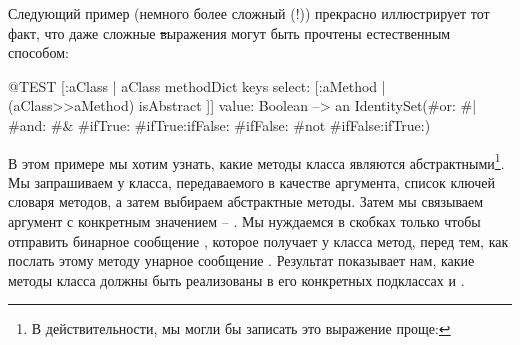 \documentclass[a4paper,10pt,twoside]{book}
\begin{document}
Следующий пример (немного более сложный (!)) прекрасно иллюстрирует тот факт, что даже сложные \st выражения могут быть прочтены естественным способом:
\begin{code}{@TEST}
[:aClass | aClass methodDict keys select: [:aMethod | (aClass>>aMethod) isAbstract ]] value: Boolean --> an IdentitySet(#or: #| #and: #& #ifTrue: #ifTrue:ifFalse: #ifFalse: #not #ifFalse:ifTrue:)
\end{code}
\noindent
В этом примере мы хотим узнать, какие методы класса  являются абстрактными\footnote{В действительности, мы могли бы записать это выражение проще: }.
Мы запрашиваем у класса, передаваемого в качестве аргумента, список ключей словаря методов, а затем выбираем абстрактные методы.
Затем мы связываем аргумент  с конкретным значением -- .
Мы нуждаемся в скобках только чтобы отправить бинарное сообщение \ct{>>}, которое получает у класса метод, перед тем, как послать этому методу унарное сообщение \mbox{}. Результат показывает нам, какие методы класса  должны быть реализованы в его конкретных подклассах  и .

\end{document}
